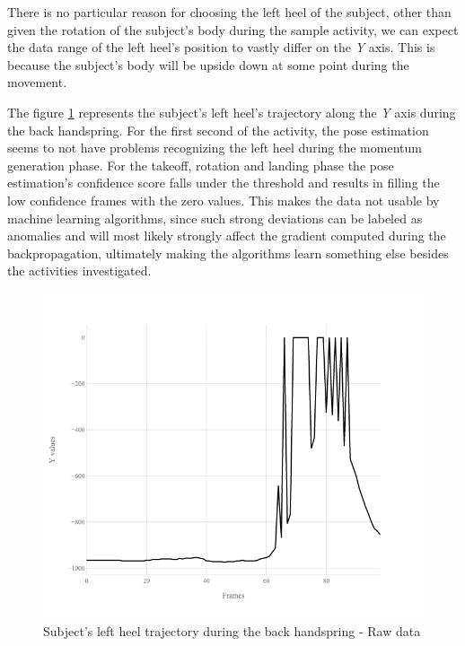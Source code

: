 There is no particular reason for choosing the left heel of the subject, other than given the rotation of the subject's body during the sample activity, we can expect the data range of the left heel's position to vastly differ on the \textit{Y} axis. This is because the subject's body will be upside down at some point during the movement.

The figure \ref{lack-17-rasmus-l-heel-y-raw} represents the subject's left heel's trajectory along the \textit{Y} axis during the back handspring. For the first second of the activity, the pose estimation seems to not have problems recognizing the left heel during the momentum generation phase. For the takeoff, rotation and landing phase the pose estimation's confidence score falls under the threshold and results in filling the low confidence frames with the zero values. This makes the data not usable by machine learning algorithms, since such strong deviations can be labeled as anomalies and will most likely strongly affect the gradient computed during the backpropagation, ultimately making the algorithms learn something else besides the activities investigated.

\begin{figure}[htb]
  \centering
    \includegraphics[width=\textwidth,keepaspectratio]
    {images/data-preprocessing/flack-17-rasmus-l-heel-y-raw}
    \caption{Subject's left heel trajectory during the back handspring - Raw data}
    \label{lack-17-rasmus-l-heel-y-raw}
\end{figure}

